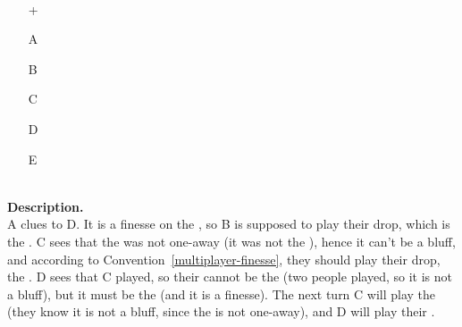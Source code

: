 \begin{example}	\hfill \\
	\begin{minipage}{0.45\textwidth}
		\begin{itemize}
			\item[\Large +]      
			\item[\Large A]    
			\item[\Large B]    
			\item[\Large C]    
			\item[\Large D]    
			\item[\Large E]    
		\end{itemize}
	\end{minipage}%
	\begin{minipage}{0.55\textwidth}
		\hfill \\
		
		\textbf{Description.} \\
		
		A clues  to D. It is a finesse on the , so B is supposed to play their drop, which is the . C sees that the  was not one-away (it was not the ), hence it can't be a bluff, and according to Convention~\ref{multiplayer-finesse}, they should play their drop, the . D sees that C played, so their  cannot be the  (two people played, so it is not a bluff), but it must be the  (and it is a finesse). The next turn C will play the  (they know it is not a bluff, since the  is not one-away), and D will play their .
	\end{minipage}
\end{example} \vspace{0.15 cm}

